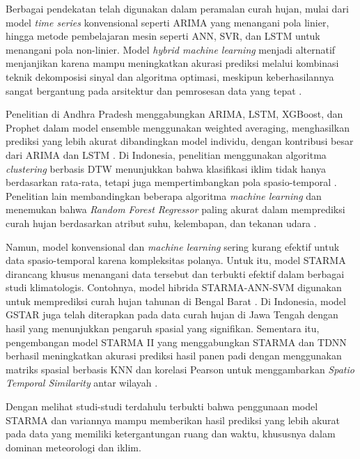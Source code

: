 Berbagai pendekatan telah digunakan dalam peramalan curah hujan, mulai dari model \textit{time series} konvensional seperti ARIMA yang menangani pola linier, hingga metode pembelajaran mesin seperti ANN, SVR, dan LSTM untuk menangani pola non-linier. Model \textit{hybrid machine learning} menjadi alternatif menjanjikan karena mampu meningkatkan akurasi prediksi melalui kombinasi teknik dekomposisi sinyal dan algoritma optimasi, meskipun keberhasilannya sangat bergantung pada arsitektur dan pemrosesan data yang tepat \citep{latif2022review}. 

Penelitian di Andhra Pradesh menggabungkan ARIMA, LSTM, XGBoost, dan Prophet dalam model ensemble menggunakan weighted averaging, menghasilkan prediksi yang lebih akurat dibandingkan model individu, dengan kontribusi besar dari ARIMA dan LSTM \citep{sravan2023leveraging}. Di Indonesia, penelitian menggunakan algoritma \textit{clustering} berbasis DTW menunjukkan bahwa klasifikasi iklim tidak hanya berdasarkan rata-rata, tetapi juga mempertimbangkan pola spasio-temporal \citep{suryana2023time}. Penelitian lain membandingkan beberapa algoritma \textit{machine learning} dan menemukan bahwa \textit{Random Forest Regressor} paling akurat dalam memprediksi curah hujan berdasarkan atribut suhu, kelembapan, dan tekanan udara \citep{jagtap2019rainfall}. 

Namun, model konvensional dan \textit{machine learning} sering kurang efektif untuk data spasio-temporal karena kompleksitas polanya. Untuk itu, model STARMA dirancang khusus menangani data tersebut dan terbukti efektif dalam berbagai studi klimatologis. Contohnya, model hibrida STARMA-ANN-SVM digunakan untuk memprediksi curah hujan tahunan di Bengal Barat \citep{saha2020hybrid}. Di Indonesia, model GSTAR juga telah diterapkan pada data curah hujan di Jawa Tengah dengan hasil yang menunjukkan pengaruh spasial yang signifikan. Sementara itu, pengembangan model STARMA II yang menggabungkan STARMA dan TDNN berhasil meningkatkan akurasi prediksi hasil panen padi dengan menggunakan matriks spasial berbasis KNN dan korelasi Pearson untuk menggambarkan \textit{Spatio Temporal Similarity} antar wilayah \citep{badu-apraku2021two}. 

Dengan melihat studi-studi terdahulu terbukti bahwa penggunaan model STARMA dan variannya mampu memberikan hasil prediksi yang lebih akurat pada data yang memiliki ketergantungan ruang dan waktu, khususnya dalam dominan meteorologi dan iklim.